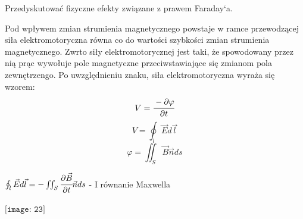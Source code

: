 \begin{task}
Przedyskutować fizyczne efekty związane z prawem Faraday`a.
\end{task}

\begin{solution}
Pod wpływem zmian strumienia magnetycznego powstaje w ramce przewodzącej siła elektromotoryczna równa co do wartości szybkości zmian strumienia magnetycznego. Zwrto siły elektromotorycznej jest taki, że spowodowany przez nią prąc wywołuje pole magnetyczne przeciwstawiające się zmianom pola zewnętrzengo.
Po uwzględnieniu znaku, siła elektromotoryczna wyraża się wzorem:
$$ V = \cfrac{-\partial\varphi}{\partial t}$$
$$ V = \oint_{l}\vec{E}d\vec{l} $$
$$ \varphi = \iint_{S}\vec{B}\vec{n}ds$$
\begin{center}
$\oint_{l}\vec{E}d\vec{l}=-\iint_{S}\cfrac{\partial\vec{B}}{\partial t}\vec{n}ds $ - I równanie Maxwella\\ \\

    $\texttt{[image: 23]}$\\
    \end{center}
\end{solution}
